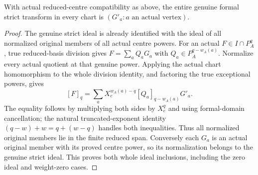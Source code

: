 \begin{theorem}
\label{hir:actual-reduced-basis-entire-formal-strict-generation}
\leanok
With actual reduced-centre compatibility as above, the entire genuine formal
strict transform in every chart is $(G'_a:a\text{ an actual vertex})$.
\end{theorem}
\begin{proof}
The genuine strict ideal is already identified with the ideal of all
normalized original members of all actual centre powers. For an actual
$F\in I\cap P_A^q$, true reduced-basis division gives
$F=\sum_a Q_aG_a$ with $Q_a\in P_A^{q-w_A(a)}$. Normalize every actual
quotient at that genuine power. Applying the actual chart homomorphism to
the whole division identity, and factoring the true exceptional powers,
gives
\[
 [F]_q=\sum_a X_e^{w_A(a)-q}[Q_a]_{q-w_A(a)}G'_a.
\]
The equality follows by multiplying both sides by $X_e^q$ and using
formal-domain cancellation; the natural truncated-exponent identity
$(q-w)+w=q+(w-q)$ handles both inequalities. Thus all normalized original
members lie in the finite reduced span. Conversely each $G_a$ is an actual
original member with its proved centre power, so its normalization belongs
to the genuine strict ideal. This proves both whole ideal inclusions,
including the zero ideal and weight-zero cases.
\end{proof}

